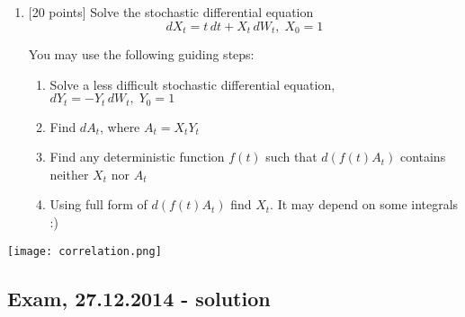 \documentclass[12pt, a4paper]{article}
\begin{document}
\begin{enumerate}
\item $[$20 points] Solve the stochastic differential equation
\[
dX_t = t \, dt + X_t \, dW_t, \; X_0=1
\]

You may use the following guiding steps:
\begin{enumerate}
\item Solve a less difficult stochastic differential equation, $dY_t=-Y_t \, dW_t, \; Y_0=1$
\item Find $dA_t$, where $A_t=X_t Y_t$
\item Find any deterministic function $f(t)$ such that $d(f(t) A_t)$ contains neither $X_t$ nor $A_t$
\item Using full form of $d(f(t) A_t)$ find $X_t$. It may depend on some integrals :)
\end{enumerate}

\end{enumerate}


\begin{center}
\texttt{[image: correlation.png]}
\end{center}


\subsection{Exam, 27.12.2014 - solution}
\end{document}

